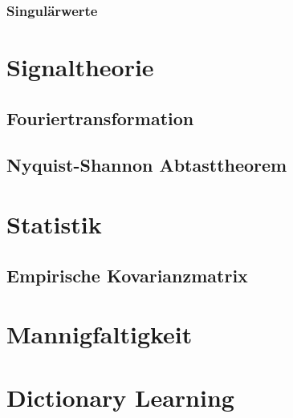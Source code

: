 \subsubsection{Singulärwerte}

\section{Signaltheorie}

\subsection{Fouriertransformation}
\subsection{Nyquist-Shannon Abtasttheorem}

\section{Statistik}

\subsection{Empirische Kovarianzmatrix}

\section{Mannigfaltigkeit}

\section{Dictionary Learning}